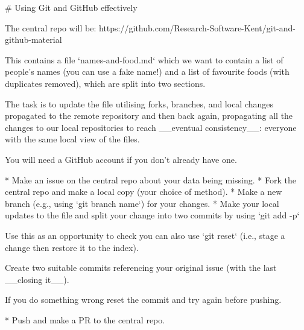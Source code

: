 # Using Git and GitHub effectively

The central repo will be: https://github.com/Research-Software-Kent/git-and-github-material

This contains a file `names-and-food.md` which we want to contain a list of people's names (you can use a fake name!) and a list of favourite foods (with duplicates removed), which are split into two sections.

The task is to update the file utilising forks, branches, and local changes propagated to the remote repository and then back again, propagating all the changes to our local repositories to reach __eventual consistency__: everyone with the same local view of the files.

You will need a GitHub account if you don't already have one.

* Make an issue on the central repo about your data being missing.
* Fork the central repo and make a local copy (your choice of method).
* Make a new branch (e.g., using `git branch name`) for your changes.
* Make your local updates to the file and split your change into two commits by using `git add -p`

Use this as an opportunity to check you can also use
 `git reset` (i.e., stage a change then restore it to the index).

Create two suitable commits referencing your original issue (with
the last __closing it__).

If you do something wrong reset the commit and try again before pushing.

* Push and make a PR to the central repo.
